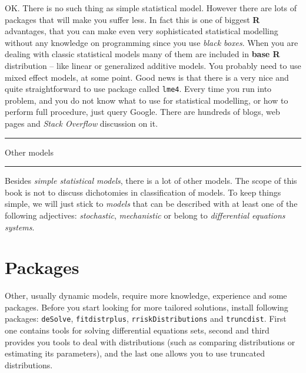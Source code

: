 \documentclass[]{book}
\theoremstyle{definition}
\theoremstyle{definition}
\theoremstyle{definition}
\theoremstyle{remark}
\begin{document}
OK. There is no such thing as simple statistical model. However there
are lots of packages that will make you suffer less. In fact this is one
of biggest \textbf{R} advantages, that you can make even very
sophisticated statistical modelling without any knowledge on programming
since you use \emph{black boxes}. When you are dealing with classic
statistical models many of them are included in \textbf{base R}
distribution -- like linear or generalized additive models. You probably
need to use mixed effect models, at some point. Good news is that there
is a very nice and quite straightforward to use package called
\texttt{lme4}. Every time you run into problem, and you do not know what
to use for statistical modelling, or how to perform full procedure, just
query Google. There are hundreds of blogs, web pages and \emph{Stack
Overflow} discussion on it.

\begin{center}\rule{0.5\linewidth}{\linethickness}\end{center}

\begin{center}
\begingroup\Large*
Other models  
\endgroup
\end{center}

\begin{center}\rule{0.5\linewidth}{\linethickness}\end{center}

Besides \emph{simple statistical models}, there is a lot of other
models. The scope of this book is not to discuss dichotomies in
classification of models. To keep things simple, we will just stick to
\emph{models} that can be described with at least one of the following
adjectives: \emph{stochastic}, \emph{mechanistic} or belong to
\emph{differential equations systems}.

\section{Packages}\label{packages}

Other, usually dynamic models, require more knowledge, experience and
some packages. Before you start looking for more tailored solutions,
install following packages: \texttt{deSolve}, \texttt{fitdistrplus},
\texttt{rriskDistributions} and \texttt{truncdist}. First one contains
tools for solving differential equations sets, second and third provides
you tools to deal with distributions (such as comparing distributions or
estimating its parameters), and the last one allows you to use truncated
distributions.
\end{document}
